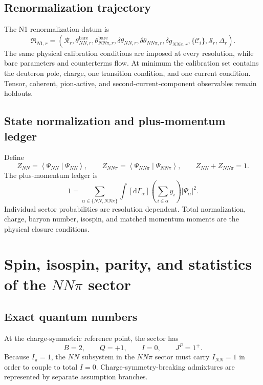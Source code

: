 \documentclass[11pt]{article}
\newcommand{\dd}{\mathrm{d}}
\newcommand{\abs}[1]{\left|#1\right|}
\newcommand{\inner}[2]{\left\langle #1\middle|#2\right\rangle}
\newcommand{\bare}{\mathrm{bare}}
\begin{document}
\subsection{Renormalization trajectory}

The N1 renormalization datum is
\begin{equation}
 \mathfrak R_{N1,r}
 =
 \left(
 \mathcal R_r,
 \theta_{NN,r}^{\bare},
 \theta_{NN\pi,r}^{\bare},
 \delta\theta_{NN,r},
 \delta\theta_{NN\pi,r},
 \delta g_{NN\pi,r},
 \{\mathcal C_i\},
 \mathcal S_r,
 \Delta_r
 \right).
 \label{eq:n1-renormalization}
\end{equation}
The same physical calibration conditions are imposed at every resolution,
while bare parameters and counterterms flow.  At minimum the calibration set
contains the deuteron pole, charge, one transition condition, and one current
condition.  Tensor, coherent, pion-active, and second-current-component
observables remain holdouts.

\subsection{State normalization and plus-momentum ledger}

Define
\begin{equation}
 Z_{NN}=\inner{\Psi_{NN}}{\Psi_{NN}},
 \qquad
 Z_{NN\pi}=\inner{\Psi_{NN\pi}}{\Psi_{NN\pi}},
 \qquad
 Z_{NN}+Z_{NN\pi}=1.
 \label{eq:sector-normalization}
\end{equation}
The plus-momentum ledger is
\begin{equation}
 1=
 \sum_{\alpha\in\{NN,NN\pi\}}
 \int[\dd\Gamma_{\alpha}]
 \left(\sum_{i\in\alpha}y_i\right)
 \abs{\Psi_{\alpha}}^2.
 \label{eq:n1-plus-ledger}
\end{equation}
Individual sector probabilities are resolution dependent.  Total
normalization, charge, baryon number, isospin, and matched momentum moments are
the physical closure conditions.

\section{Spin, isospin, parity, and statistics of the \texorpdfstring{\(NN\pi\)}{NNpi} sector}
\label{sec:sector}

\subsection{Exact quantum numbers}

At the charge-symmetric reference point, the sector has
\begin{equation}
 B=2,
 \qquad Q=+1,
 \qquad I=0,
 \qquad J^P=1^+.
 \label{eq:nnpi-quantum-numbers}
\end{equation}
Because \(I_\pi=1\), the \(NN\) subsystem in the \(NN\pi\) sector must carry
\(I_{NN}=1\) in order to couple to total \(I=0\).  Charge-symmetry-breaking
admixtures are represented by separate assumption branches.
\end{document}

